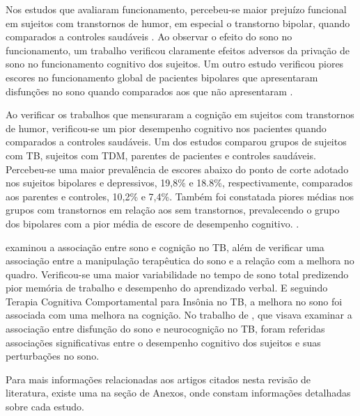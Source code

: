 \documentclass[chapter=TITLE,
               oneside,
               12pt,
               a4paper,
               english,
               brazil]{abntex2}    %
\begin{document}
        Nos estudos que avaliaram funcionamento, percebeu-se maior prejuízo 
        funcional em sujeitos com transtornos de humor, em especial o
        transtorno bipolar, quando comparados a controles saudáveis
        \parencite{reyes_functional_2017,
        kapczinski_cognition_2016,
        rosa_functional_2010,
        rosa_clinical_2009}.
        Ao observar o efeito do sono no funcionamento, um trabalho verificou
        claramente efeitos adversos da privação de sono no funcionamento 
        cognitivo dos sujeitos. Um outro estudo verificou piores escores no
        funcionamento global de pacientes bipolares que apresentaram disfunções
        no sono quando comparados aos que não apresentaram
        \parencite{harvey_sleep_2009,
        giglio_sleep_2009}.

        Ao verificar os trabalhos que mensuraram a cognição em sujeitos com
        transtornos de humor, verificou-se um pior desempenho cognitivo
        nos pacientes quando comparados a controles saudáveis. Um dos estudos
        comparou grupos de sujeitos com TB, sujeitos com TDM, parentes de
        pacientes e controles saudáveis. Percebeu-se uma maior prevalência
        de escores abaixo do ponto de corte adotado nos sujeitos bipolares e
        depressivos, 19,8\% e 18.8\%, respectivamente, comparados aos parentes
        e controles, 10,2\% e 7,4\%. Também foi constatada piores médias nos
        grupos com transtornos em relação aos sem transtornos, prevalecendo o
        grupo dos bipolares com a pior média de escore de desempenho cognitivo.
        \parencite{schneider_cognitive_2008,
        bo_comparison_2019}.

        \textcite{kanady_association_2017} examinou a associação entre sono e
        cognição no TB, além de verificar uma associação entre a manipulação
        terapêutica do sono e a relação com a melhora no quadro.
        Verificou-se uma maior variabilidade no tempo de sono total predizendo
        pior memória de trabalho e desempenho do aprendizado verbal.
        E seguindo Terapia Cognitiva Comportamental para Insônia no TB, a melhora
        no sono foi associada com uma melhora na cognição.
        No trabalho de \textcite{russo_relationship_2015}, que visava examinar
        a associação entre disfunção do sono e neurocognição no TB, foram
        referidas associações significativas entre o desempenho cognitivo dos
        sujeitos e suas perturbações no sono.

        Para mais informações relacionadas aos artigos citados nesta revisão
        de literatura, existe uma  na seção de Anexos,
        onde constam informações detalhadas sobre cada estudo.
\end{document}
